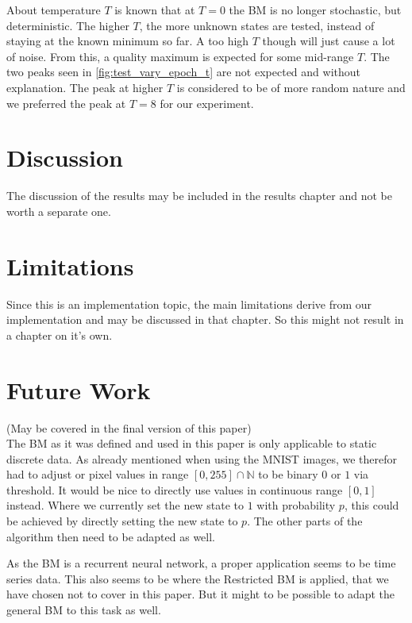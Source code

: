 \documentclass[12pt,twoside]{article}
\theoremstyle{plain}
\theoremstyle{definition}
\theoremstyle{remark}
\begin{document}
About temperature $T$ is known that at $T=0$ the BM is no longer stochastic, but deterministic. The higher $T$, the more unknown states are tested, instead of staying at the known minimum so far. A too high $T$ though will just cause a lot of noise. From this, a quality maximum is expected for some mid-range $T$. The two peaks seen in \cref{fig:test_vary_epoch_t} are not expected and without explanation. The peak at higher $T$ is considered to be of more random nature and we preferred the peak at $T=8$ for our experiment.



\section{Discussion}
\label{sec:discuss}

The discussion of the results may be included in the results chapter and not be worth a separate one. %


\section{Limitations}
\label{sec:limits}

Since this is an implementation topic, the main limitations derive from our implementation and may be discussed in that chapter. So this might not result in a chapter on it's own. %


\section{Future Work}
\label{sec:future}

(May be covered in the final version of this paper)\\

\noindent
The BM as it was defined and used in this paper is only applicable to static discrete data. As already mentioned when using the MNIST images, we therefor had to adjust or pixel values in range $[0,255]\cap\mathbb{N}$ to be binary $0$ or $1$ via threshold. It would be nice to directly use values in continuous range $[0,1]$ instead. Where we currently set the new state to $1$ with probability $p$, this could be achieved by directly setting the new state to $p$. The other parts of the algorithm then need to be adapted as well.

As the BM is a recurrent neural network, a proper application seems to be time series data. This also seems to be where the Restricted BM is applied, that we have chosen not to cover in this paper. But it might to be possible to adapt the general BM to this task as well.
\end{document}
